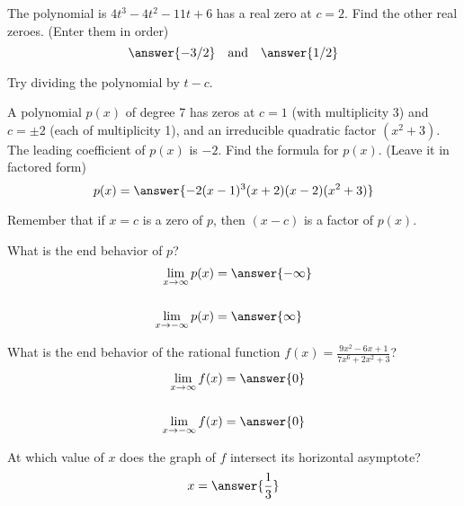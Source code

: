 \documentclass{ximera}
\author{Bobby Ramsey}
\begin{document}
\begin{exercise}
	The polynomial is $\displaystyle 4t^3-4t^2 - 11t+6$ has a real zero at $c = 2$.  Find the other real zeroes. (Enter them in order)
	\[ \answer{ -3/2}  \quad \text{and} \quad \answer{1/2 } \]
	\begin{hint}
		Try dividing the polynomial by $t-c$.  
	\end{hint}
\end{exercise}

\begin{exercise}
	A polynomial $p(x)$ of degree 7 has zeros at $c = 1$ (with multiplicity 3) and $c = \pm 2$ (each of multiplicity 1), and an irreducible quadratic factor $(x^2+3)$.  
	The leading coefficient of $p(x)$ is $-2$.  Find the formula for $p(x)$. (Leave it in factored form)
	\[ p(x) = \answer{-2(x-1)^3(x+2)(x-2)(x^2+3)} \]
	\begin{hint}
		Remember that if $x=c$ is a zero of $p$, then $(x-c)$ is a factor of $p(x)$.
	\end{hint}
	\begin{exercise}
		What is the end behavior of $p$?
		\begin{align*}
			\lim_{x\to \infty} p(x) &= \answer{-\infty} \\ \\
			\lim_{x\to -\infty} p(x) &= \answer{\infty}
		\end{align*}	
	\end{exercise}	
\end{exercise}

\begin{exercise}
	What is the end behavior of the rational function $f(x) = \frac{9x^2-6x+1}{7x^6+2x^2+3}$?
	\begin{align*}
		\lim_{x\to \infty} f(x) &= \answer{0}\\ \\
		\lim_{x\to -\infty} f(x) &= \answer{0}
	\end{align*}
	\begin{exercise}
		At which value of $x$ does the graph of $f$ intersect its horizontal asymptote?  
		\[ x = \answer{\frac{1}{3}} \]
	\end{exercise}
\end{exercise}
\end{document}
